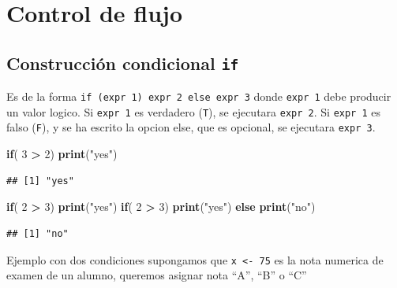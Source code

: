 \documentclass[]{book}
\newenvironment{Shaded}{\begin{snugshade}}{\end{snugshade}}
\newcommand{\KeywordTok}[1]{\textcolor[rgb]{0.13,0.29,0.53}{\textbf{#1}}}
\newcommand{\DecValTok}[1]{\textcolor[rgb]{0.00,0.00,0.81}{#1}}
\newcommand{\StringTok}[1]{\textcolor[rgb]{0.31,0.60,0.02}{#1}}
\newcommand{\ControlFlowTok}[1]{\textcolor[rgb]{0.13,0.29,0.53}{\textbf{#1}}}
\newcommand{\OperatorTok}[1]{\textcolor[rgb]{0.81,0.36,0.00}{\textbf{#1}}}
\newcommand{\NormalTok}[1]{#1}
\begin{document}
\hypertarget{control-de-flujo}{%
\chapter{Control de flujo}\label{control-de-flujo}}

\hypertarget{construccion-condicional-if}{%
\section{\texorpdfstring{Construcción condicional
\texttt{if}}{Construcción condicional if}}\label{construccion-condicional-if}}

Es de la forma \texttt{if\ (expr\ 1)\ expr\ 2\ else\ expr\ 3} donde
\texttt{expr\ 1} debe producir un valor logico. Si \texttt{expr\ 1} es
verdadero (\texttt{T}), se ejecutara \texttt{expr\ 2}. Si
\texttt{expr\ 1} es falso (\texttt{F}), y se ha escrito la opcion else,
que es opcional, se ejecutara \texttt{expr\ 3}.

\begin{Shaded}
\begin{Highlighting}[]
\ControlFlowTok{if}\NormalTok{( }\DecValTok{3} \OperatorTok{>}\StringTok{ }\DecValTok{2}\NormalTok{) }\KeywordTok{print}\NormalTok{(}\StringTok{"yes"}\NormalTok{)}
\end{Highlighting}
\end{Shaded}

\begin{verbatim}
## [1] "yes"
\end{verbatim}

\begin{Shaded}
\begin{Highlighting}[]
\ControlFlowTok{if}\NormalTok{( }\DecValTok{2} \OperatorTok{>}\StringTok{ }\DecValTok{3}\NormalTok{) }\KeywordTok{print}\NormalTok{(}\StringTok{"yes"}\NormalTok{)}
\ControlFlowTok{if}\NormalTok{( }\DecValTok{2} \OperatorTok{>}\StringTok{ }\DecValTok{3}\NormalTok{) }\KeywordTok{print}\NormalTok{(}\StringTok{"yes"}\NormalTok{) }\ControlFlowTok{else} \KeywordTok{print}\NormalTok{(}\StringTok{"no"}\NormalTok{)}
\end{Highlighting}
\end{Shaded}

\begin{verbatim}
## [1] "no"
\end{verbatim}

Ejemplo con dos condiciones supongamos que \texttt{x\ \textless{}-\ 75}
es la nota numerica de examen de un alumno, queremos asignar nota ``A'',
``B'' o ``C''
\end{document}
